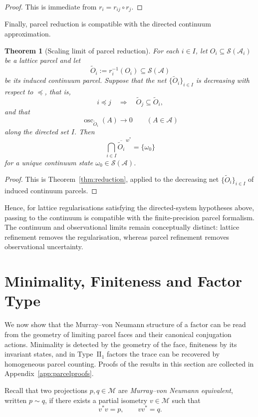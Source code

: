 \documentclass[11pt]{article}
\newtheorem{theorem}{Theorem}[section]
\begin{document}
\begin{proof}
This is immediate from $r_i=r_{ij}\circ r_j$.
\end{proof}

Finally, parcel reduction is compatible with the directed continuum
approximation.

\begin{theorem}[Scaling limit of parcel reduction]
\label{thm:scalingreduction}
For each $i\in I$, let
$O_i\subseteq\mathcal S(\mathcal A_i)$ be a lattice parcel and let
\[
\widetilde O_i:=r_i^{-1}(O_i)
\subseteq\mathcal S(\mathcal A)
\]
be its induced continuum parcel. Suppose that the net
$\{\widetilde O_i\}_{i\in I}$ is decreasing with respect to
$\preceq$, that is,
\[
i\preceq j
\quad\Longrightarrow\quad
\widetilde O_j\subseteq\widetilde O_i,
\]
and that
\[
\operatorname{osc}_{\widetilde O_i}(A)\longrightarrow0
\qquad(A\in\mathcal A)
\]
along the directed set $I$. Then
\[
\bigcap_{i\in I}
\overline{\widetilde O_i}^{\,w^*}
=
\{\omega_0\}
\]
for a unique continuum state
$\omega_0\in\mathcal S(\mathcal A)$.
\end{theorem}

\begin{proof}
This is Theorem~\ref{thm:reduction}, applied to the decreasing net
$\{\widetilde O_i\}_{i\in I}$ of induced continuum parcels.
\end{proof}

Hence, for lattice regularisations satisfying the directed-system
hypotheses above, passing to the continuum is compatible with the
finite-precision parcel formalism. The continuum and observational limits
remain conceptually distinct: lattice refinement removes the
regularisation, whereas parcel refinement removes observational
uncertainty.
\section{Minimality, Finiteness and Factor Type}
\label{sec:minimality-finiteness}

We now show that the Murray--von Neumann structure of a factor can be
read from the geometry of limiting parcel faces and their canonical
conjugation actions. Minimality is detected by the geometry of the face,
finiteness by its invariant states, and in Type~$\mathrm{II}_1$ factors
the trace can be recovered by homogeneous parcel counting. Proofs of the
results in this section are collected in
Appendix~\ref{app:parcelproofs}.

Recall that two projections $p,q\in\mathcal M$ are
\emph{Murray--von Neumann equivalent}, written $p\sim q$, if there
exists a partial isometry $v\in\mathcal M$ such that
\[
v^*v=p,
\qquad
vv^*=q.
\]
\end{document}
